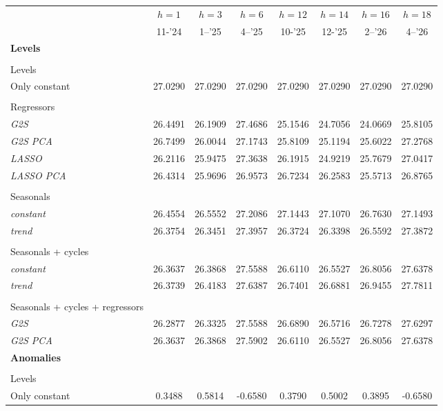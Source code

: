 \begin{tabular}{lccccccc}
\toprule
& $h=1$ & $h=3$ & $h=6$ & $h=12$ & $h=14$ & $h=16$ & $h=18$\\
& 11-'24 & 1--'25 & 4--'25 & 10-'25 & 12-'25 & 2--'26 & 4--'26\\
\midrule
\textbf{Levels}\\
\\
Levels \\
Only constant & 27.0290 & 27.0290 & 27.0290 & 27.0290 & 27.0290 & 27.0290 & 27.0290\\
\\
Regressors \\
\quad \textit{G2S} & 26.4491 & 26.1909 & 27.4686 & 25.1546 & 24.7056 & 24.0669 & 25.8105\\
\quad \textit{G2S PCA} & 26.7499 & 26.0044 & 27.1743 & 25.8109 & 25.1194 & 25.6022 & 27.2768\\
\quad \textit{LASSO} & 26.2116 & 25.9475 & 27.3638 & 26.1915 & 24.9219 & 25.7679 & 27.0417\\
\quad \textit{LASSO PCA} & 26.4314 & 25.9696 & 26.9573 & 26.7234 & 26.2583 & 25.5713 & 26.8765\\
\\
Seasonals \\
\quad \textit{constant} & 26.4554 & 26.5552 & 27.2086 & 27.1443 & 27.1070 & 26.7630 & 27.1493\\
\quad \textit{trend} & 26.3754 & 26.3451 & 27.3957 & 26.3724 & 26.3398 & 26.5592 & 27.3872\\
\\
Seasonals + cycles \\
\quad \textit{constant} & 26.3637 & 26.3868 & 27.5588 & 26.6110 & 26.5527 & 26.8056 & 27.6378\\
\quad \textit{trend} & 26.3739 & 26.4183 & 27.6387 & 26.7401 & 26.6881 & 26.9455 & 27.7811\\
\\
Seasonals + cycles + regressors \\
\quad \textit{G2S} & 26.2877 & 26.3325 & 27.5588 & 26.6890 & 26.5716 & 26.7278 & 27.6297\\
\quad \textit{G2S PCA} & 26.3637 & 26.3868 & 27.5902 & 26.6110 & 26.5527 & 26.8056 & 27.6378\\
\midrule
\textbf{Anomalies}\\
\\
Levels \\
Only constant & 0.3488 & 0.5814 & -0.6580 & 0.3790 & 0.5002 & 0.3895 & -0.6580\\

\end{tabular}
